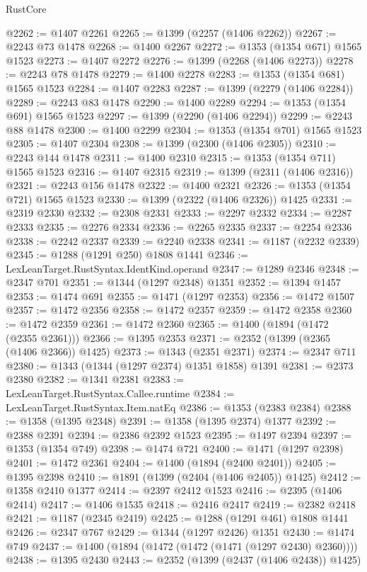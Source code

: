 \begin{lexlean}{RustCore}
\begin{coremodule}
{\begin{coremodule}
{{{{{{{{{{{{{{{{{{{{{{{{{{{{{{{{{{{{{{{{{{{{@2262 := @1407 @2261
@2265 := @1399 (@2257 (@1406 @2262))
@2267 := @2243 @73 @1478
@2268 := @1400 @2267
@2272 := @1353 (@1354 @671) @1565 @1523
@2273 := @1407 @2272
@2276 := @1399 (@2268 (@1406 @2273))
@2278 := @2243 @78 @1478
@2279 := @1400 @2278
@2283 := @1353 (@1354 @681) @1565 @1523
@2284 := @1407 @2283
@2287 := @1399 (@2279 (@1406 @2284))
@2289 := @2243 @83 @1478
@2290 := @1400 @2289
@2294 := @1353 (@1354 @691) @1565 @1523
@2297 := @1399 (@2290 (@1406 @2294))
@2299 := @2243 @88 @1478
@2300 := @1400 @2299
@2304 := @1353 (@1354 @701) @1565 @1523
@2305 := @1407 @2304
@2308 := @1399 (@2300 (@1406 @2305))
@2310 := @2243 @144 @1478
@2311 := @1400 @2310
@2315 := @1353 (@1354 @711) @1565 @1523
@2316 := @1407 @2315
@2319 := @1399 (@2311 (@1406 @2316))
@2321 := @2243 @156 @1478
@2322 := @1400 @2321
@2326 := @1353 (@1354 @721) @1565 @1523
@2330 := @1399 (@2322 (@1406 @2326)) @1425
@2331 := @2319 @2330
@2332 := @2308 @2331
@2333 := @2297 @2332
@2334 := @2287 @2333
@2335 := @2276 @2334
@2336 := @2265 @2335
@2337 := @2254 @2336
@2338 := @2242 @2337
@2339 := @2240 @2338
@2341 := @1187 (@2232 @2339)
@2345 := @1288 (@1291 @250) @1808 @1441
@2346 := LexLeanTarget.RustSyntax.IdentKind.operand
@2347 := @1289 @2346
@2348 := @2347 @701
@2351 := @1344 (@1297 @2348) @1351
@2352 := @1394 @1457
@2353 := @1474 @691
@2355 := @1471 (@1297 @2353)
@2356 := @1472 @1507
@2357 := @1472 @2356
@2358 := @1472 @2357
@2359 := @1472 @2358
@2360 := @1472 @2359
@2361 := @1472 @2360
@2365 := @1400 (@1894 (@1472 (@2355 @2361)))
@2366 := @1395 @2353
@2371 := @2352 (@1399 (@2365 (@1406 @2366)) @1425)
@2373 := @1343 (@2351 @2371)
@2374 := @2347 @711
@2380 := @1343 (@1344 (@1297 @2374) @1351 @1858) @1391
@2381 := @2373 @2380
@2382 := @1341 @2381
@2383 := LexLeanTarget.RustSyntax.Callee.runtime
@2384 := LexLeanTarget.RustSyntax.Item.natEq
@2386 := @1353 (@2383 @2384)
@2388 := @1358 (@1395 @2348)
@2391 := @1358 (@1395 @2374) @1377
@2392 := @2388 @2391
@2394 := @2386 @2392 @1523
@2395 := @1497 @2394
@2397 := @1353 (@1354 @749)
@2398 := @1474 @721
@2400 := @1471 (@1297 @2398)
@2401 := @1472 @2361
@2404 := @1400 (@1894 (@2400 @2401))
@2405 := @1395 @2398
@2410 := @1891 (@1399 (@2404 (@1406 @2405)) @1425)
@2412 := @1358 @2410 @1377
@2414 := @2397 @2412 @1523
@2416 := @2395 (@1406 @2414)
@2417 := @1406 @1535
@2418 := @2416 @2417
@2419 := @2382 @2418
@2421 := @1187 (@2345 @2419)
@2425 := @1288 (@1291 @461) @1808 @1441
@2426 := @2347 @767
@2429 := @1344 (@1297 @2426) @1351
@2430 := @1474 @749
@2437 := @1400 (@1894 (@1472 (@1472 (@1471 (@1297 @2430) @2360))))
@2438 := @1395 @2430
@2443 := @2352 (@1399 (@2437 (@1406 @2438)) @1425)
}}}}}}}}}}}}}}}}}}}}}}}}}}}}}}}}}}}}}}}}}}}}
\end{coremodule}}
\end{coremodule}
\end{lexlean}
